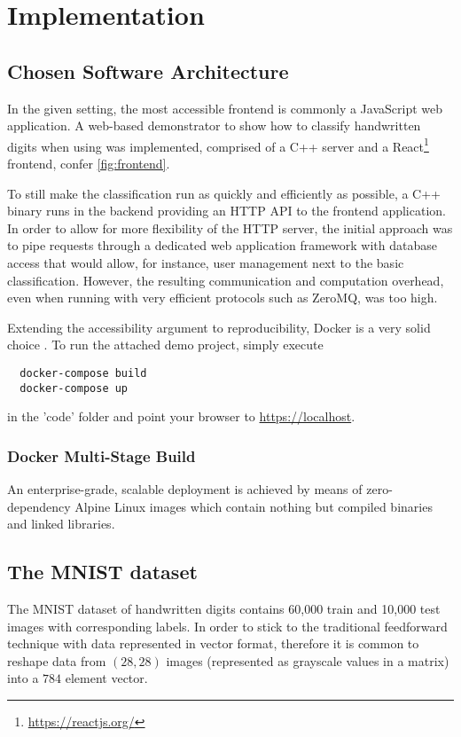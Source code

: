 \chapter{Implementation}
\label{chap:implementation}

\section{Chosen Software Architecture}
In the given setting, the most accessible frontend is commonly a JavaScript web application.
A web-based demonstrator to show how to classify handwritten digits when using  was implemented, comprised of a C++ server and a React\footnote{\url{https://reactjs.org/}} frontend, confer \autoref{fig:frontend}.

To still make the classification run as quickly and efficiently as possible, a C++ binary runs in the backend providing an HTTP API to the frontend application.
In order to allow for more flexibility of the HTTP server, the initial approach was to pipe requests through a dedicated web application framework with database access that would allow, for instance, user management next to the basic classification.
However, the resulting communication and computation overhead, even when running with very efficient protocols such as ZeroMQ, was too high.

Extending the accessibility argument to reproducibility, Docker is a very solid choice \parencite{using-docker-in-science}.
To run the attached demo project, simply execute
\begin{verbatim}
  docker-compose build
  docker-compose up
\end{verbatim}
in the 'code' folder and point your browser to \url{https://localhost}.


\subsection{Docker Multi-Stage Build}
An enterprise-grade, scalable deployment is achieved by means of zero-dependency
Alpine Linux images which contain nothing but compiled binaries and linked libraries.

\section{The MNIST dataset}
The MNIST dataset of handwritten digits \parencite{mnist-original} contains 60,000 train and 10,000 test images with corresponding labels.
In order to stick to the traditional feedforward technique with data represented in vector format, therefore it is common to reshape data from $(28, 28)$ images (represented as grayscale values in a matrix)
into a $784$ element vector.


